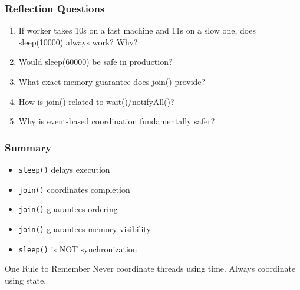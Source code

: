 \documentclass[aspectratio=169,11pt]{beamer}
\begin{document}
	\begin{frame}
		\frametitle{Reflection Questions}
		
		\begin{enumerate}
			\item If worker takes 10s on a fast machine and 11s on a slow one, does sleep(10000) always work? Why?
			\item Would sleep(60000) be safe in production?
			\item What exact memory guarantee does join() provide?
			\item How is join() related to wait()/notifyAll()?
			\item Why is event-based coordination fundamentally safer?
		\end{enumerate}
		
	\end{frame}
	
	\begin{frame}
		\frametitle{Summary}
		
		\begin{itemize}
			\item \texttt{sleep()} delays execution
			\item \texttt{join()} coordinates completion
			\item \texttt{join()} guarantees ordering
			\item \texttt{join()} guarantees memory visibility
			\item \texttt{sleep()} is NOT synchronization
		\end{itemize}
		
		\vspace{5mm}
		
		\begin{block}{One Rule to Remember}
			Never coordinate threads using time. Always coordinate using state.
		\end{block}
		
	\end{frame}
	
\end{document}
